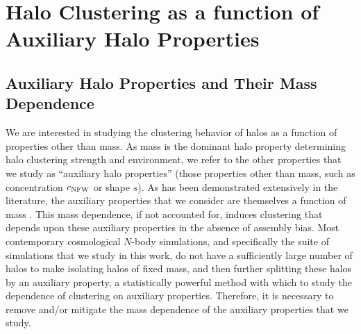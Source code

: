 \documentclass[usenatbib,fleqn]{mnras}
\begin{document}
\section[]{Halo Clustering as a function of Auxiliary Halo Properties}
\label{section:methodology}

\subsection{Auxiliary Halo Properties and Their Mass Dependence}
\label{subsection:properties}

We are interested in studying the clustering behavior of halos as a function of 
properties other than mass. As mass is the dominant halo property determining halo
clustering strength and environment, we refer to the other properties that we study as 
``auxiliary halo properties'' (those properties other than mass, such as concentration 
$c_{\rm NFW}$ or shape $s$). As has been demonstrated extensively in the literature, 
the auxiliary properties that we consider are themselves 
a function of mass \citep{bullock_etal02,allgood_etal06, duffy_etal08, despali_etal16}. 
This mass dependence, if not accounted for, induces clustering that depends upon these auxiliary properties in the absence of assembly bias. 
Most contemporary cosmological $N$-body simulations, and specifically the suite of simulations 
that we study in this work, do not have a sufficiently large number of halos to make isolating halos 
of fixed mass, and then further splitting these halos by an auxiliary property, a statistically 
powerful method with which to study the dependence of clustering on auxiliary properties. 
Therefore, it is necessary to remove and/or mitigate the mass dependence of the auxiliary 
properties that we study. 
\end{document}
